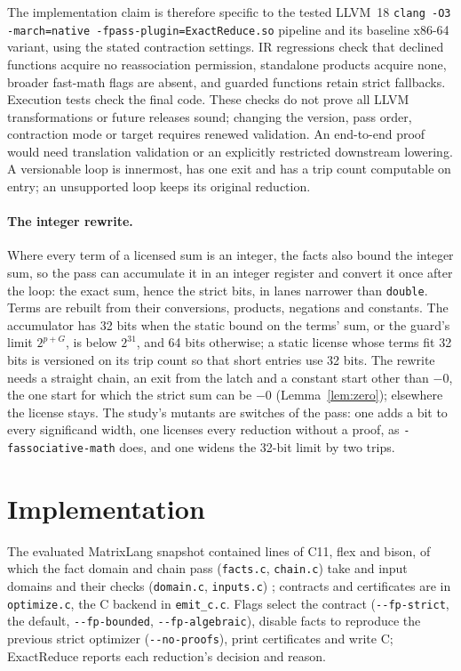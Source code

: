 \documentclass[acmsmall,review,anonymous,nonacm]{acmart}
\begin{document}
The implementation claim is therefore specific to the tested LLVM~18
\texttt{clang -O3 -march=native -fpass-plugin=ExactReduce.so} pipeline and its
baseline x86-64 variant, using the stated contraction settings. IR regressions
check that declined functions acquire no reassociation permission, standalone
products acquire none, broader fast-math flags are absent, and guarded
functions retain strict fallbacks. Execution tests check the final code.
These checks do not prove all LLVM transformations or future releases sound;
changing the version, pass order, contraction mode or target requires renewed
validation. An end-to-end proof would need translation validation or an
explicitly restricted downstream lowering. A versionable loop is innermost,
has one exit and has a trip count computable on entry; an unsupported loop
keeps its original reduction.

\paragraph{The integer rewrite.} Where every term of a licensed sum is an
integer, the facts also bound the integer sum, so the pass can accumulate it in
an integer register and convert it once after the loop: the exact sum, hence
the strict bits, in lanes narrower than \texttt{double}. Terms are rebuilt from
their conversions, products, negations and constants. The accumulator has 32
bits when the static bound on the terms' sum, or the guard's limit $2^{p+G}$,
is below $2^{31}$, and 64 bits otherwise; a static license whose terms fit 32
bits is versioned on its trip count so that short entries use 32 bits. The
rewrite needs a straight chain, an exit from the latch and a constant start
other than $-0$, the one start for which the strict sum can be $-0$
(Lemma~\ref{lem:zero}); elsewhere the license stays. The study's mutants are
switches of the pass: one adds a bit to every significand width, one licenses
every reduction without a proof, as \texttt{-fassociative-math} does, and one
widens the 32-bit limit by two trips.

\section{Implementation}
The evaluated MatrixLang snapshot contained \RqImplLoc{} lines of C11, flex and bison, of which
the fact domain and chain pass (\texttt{facts.c}, \texttt{chain.c}) take
\RqImplFactsLoc{} and input domains and their checks (\texttt{domain.c},
\texttt{inputs.c}) \RqImplInputsLoc; contracts and certificates are in
\texttt{optimize.c}, the C backend in \texttt{emit\_c.c}. Flags select the
contract (\texttt{-{}-fp-strict}, the default, \texttt{-{}-fp-bounded},
\texttt{-{}-fp-algebraic}), disable facts to reproduce the previous strict
optimizer (\texttt{-{}-no-proofs}), print certificates and write C; ExactReduce
reports each reduction's decision and reason.
\end{document}
